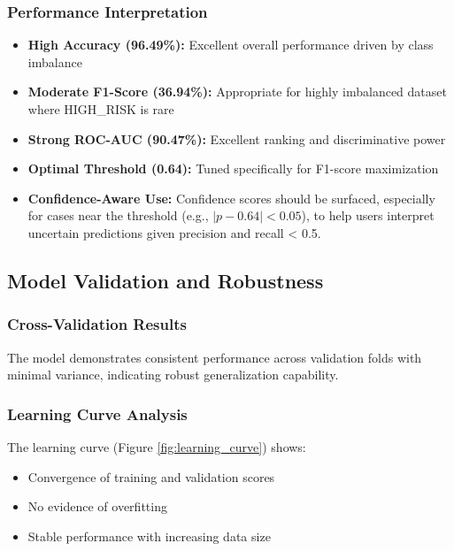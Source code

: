 \documentclass[11pt]{article}
\begin{document}
\subsubsection{Performance Interpretation}
\begin{itemize}[leftmargin=*]
\item \textbf{High Accuracy (96.49\%):} Excellent overall performance driven by class imbalance
\item \textbf{Moderate F1-Score (36.94\%):} Appropriate for highly imbalanced dataset where HIGH\_RISK is rare
\item \textbf{Strong ROC-AUC (90.47\%):} Excellent ranking and discriminative power
\item \textbf{Optimal Threshold (0.64):} Tuned specifically for F1-score maximization
\item \textbf{Confidence-Aware Use:} Confidence scores should be surfaced, especially for cases near the threshold (e.g., $|p-0.64|<0.05$), to help users interpret uncertain predictions given precision and recall < 0.5.
\end{itemize}

\subsection{Model Validation and Robustness}

\subsubsection{Cross-Validation Results}
The model demonstrates consistent performance across validation folds with minimal variance, indicating robust generalization capability.

\subsubsection{Learning Curve Analysis}
The learning curve (Figure \ref{fig:learning_curve}) shows:
\begin{itemize}[leftmargin=*]
\item Convergence of training and validation scores
\item No evidence of overfitting
\item Stable performance with increasing data size
\end{itemize}
\end{document}
